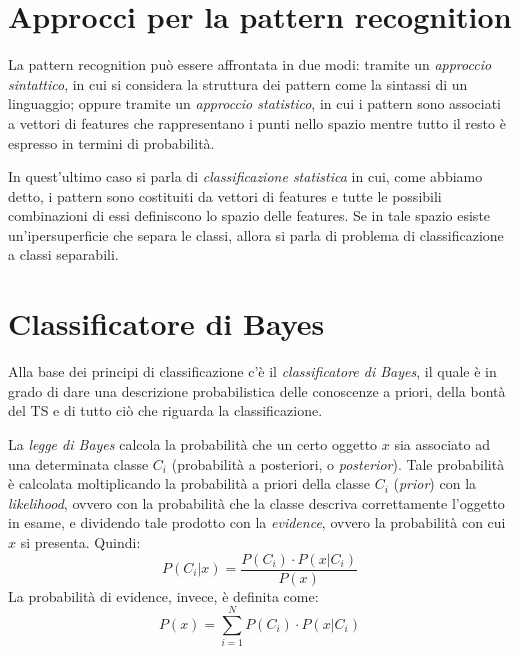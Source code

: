 \documentclass[a4paper,oneside,titlepage]{book}
\begin{document}
\section{Approcci per la pattern recognition}
La pattern recognition può essere affrontata in due modi: tramite un \textit{approccio sintattico}, in cui si considera la struttura dei pattern come la sintassi di un linguaggio; oppure tramite un \textit{approccio statistico}, in cui i pattern sono associati a vettori di features che rappresentano i punti nello spazio mentre tutto il resto è espresso in termini di probabilità.

In quest'ultimo caso si parla di \textit{classificazione statistica} in cui, come abbiamo detto, i pattern sono costituiti da vettori di features e tutte le possibili combinazioni di essi definiscono lo spazio delle features. Se in tale spazio esiste un'ipersuperficie che separa le classi, allora si parla di problema di classificazione a classi separabili.

\section{Classificatore di Bayes}
Alla base dei principi di classificazione c'è il \textit{classificatore di Bayes}, il quale è in grado di dare una descrizione probabilistica delle conoscenze a priori, della bontà del TS e di tutto ciò che riguarda la classificazione.

La \textit{legge di Bayes} calcola la probabilità che un certo oggetto $x$ sia associato ad una determinata classe $C_i$ (probabilità a posteriori, o \textit{posterior}). Tale probabilità è calcolata moltiplicando la probabilità a priori della classe $C_i$ (\textit{prior}) con la \textit{likelihood}, ovvero con la probabilità che la classe descriva correttamente l'oggetto in esame, e dividendo tale prodotto con la \textit{evidence}, ovvero la probabilità con cui $x$ si presenta. Quindi:
\[ P(C_i|x)=\frac{P(C_i) \cdot P(x|C_i)}{P(x)} \]
La probabilità di evidence, invece, è definita come:
\[ P(x) = \sum_{i=1}^N P(C_i) \cdot P(x|C_i) \]
\end{document}
